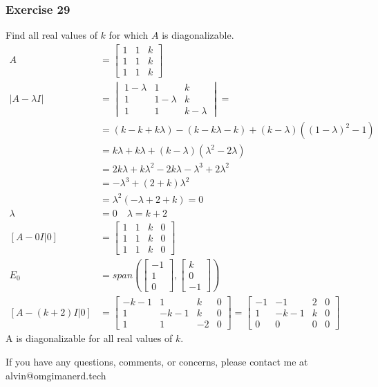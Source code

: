 \documentclass{math}
\begin{document}
\subsubsection*{Exercise 29}
Find all real values of \( k \) for which \( A \) is diagonalizable.
\begin{align*}
  A &= \begin{bmatrix}
    1 & 1 & k \\
    1 & 1 & k \\
    1 & 1 & k
  \end{bmatrix} \\
  |A-\lambda I| &= \begin{vmatrix}
    1-\lambda & 1 & k \\
    1 & 1-\lambda & k \\
    1 & 1 & k-\lambda
  \end{vmatrix} = \\
  &= (k-k+k\lambda)-(k-k\lambda-k)+(k-\lambda)((1-\lambda)^2-1) \\
  &= k\lambda+k\lambda+(k-\lambda)(\lambda^2-2\lambda) \\
  &= 2k\lambda+k\lambda^2-2k\lambda-\lambda^3+2\lambda^2 \\
  &= -\lambda^3+(2+k)\lambda^2 \\
  &= \lambda^2(-\lambda+2+k) = 0 \\
  \lambda &= 0 \quad \lambda = k+2 \\
  [A-0I|0] &= \begin{bmatrix}
    1 & 1 & k & 0 \\
    1 & 1 & k & 0 \\
    1 & 1 & k & 0
  \end{bmatrix} \\
  E_0 &= span\left(\begin{bmatrix}-1 \\ 1 \\ 0\end{bmatrix},
    \begin{bmatrix}k \\ 0 \\ -1\end{bmatrix}\right) \\
  [A-(k+2)I|0] &= \begin{bmatrix}
    -k-1 & 1 & k & 0 \\
    1 & -k-1 & k & 0 \\
    1 & 1 & -2 & 0
  \end{bmatrix} = \begin{bmatrix}
    -1 & -1 & 2 & 0 \\
    1 & -k-1 & k & 0 \\
    0 & 0 & 0 & 0
  \end{bmatrix}
\end{align*}
A is diagonalizable for all real values of \( k \).

\begin{center}
  If you have any questions, comments, or concerns, please contact me at
  alvin@omgimanerd.tech
\end{center}
\end{document}
